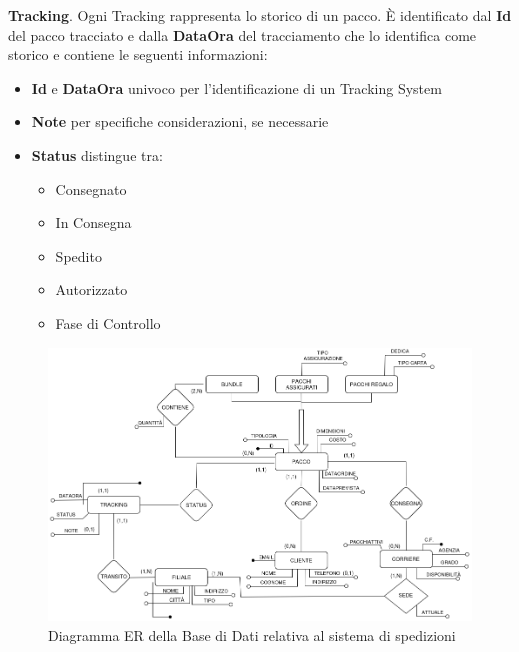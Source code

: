 \textbf{Tracking}. Ogni Tracking rappresenta lo storico di un pacco. È identificato dal \textbf{Id} del pacco tracciato e dalla \textbf{DataOra} del tracciamento che lo identifica come storico e contiene le seguenti informazioni:
\begin{itemize}
    \setlength{\itemindent}{+.5in}
    \item \textbf{Id} e \textbf{DataOra} univoco per l'identificazione di un Tracking System
    \item \textbf{Note} per specifiche considerazioni, se necessarie
    \item \textbf{Status} distingue tra:
     \begin{itemize}
            \setlength{\itemindent}{+.5in}
            \item Consegnato
            \item In Consegna
            \item Spedito
            \item Autorizzato
            \item Fase di Controllo
        \end{itemize}
\end{itemize}



\begin{figure}[H]
\centering
\includegraphics[width=1\textwidth]{Resources/ER.png}
\caption{Diagramma ER della Base di Dati relativa al sistema di spedizioni}
\label{ER}
\end{figure}